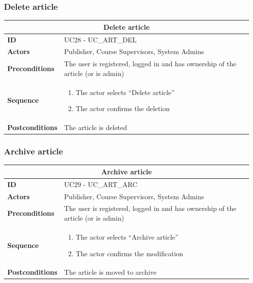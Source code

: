\subsubsection{Delete article}
\begin{tabular}{|m{2.5cm}|m{8cm}|}
	\hline
	\multicolumn{2}{|c|}{Delete article} \\
	\hline
	\textbf{ID} & UC28 - UC\_ART\_DEL \\
	\hline
	\textbf{Actors} & Publisher, Course Supervisors, System Admins \\
	\hline
	\textbf{Preconditions} & The user is registered, logged in and has ownership of the article (or is admin) \\
	\hline
	\textbf{Sequence} & 
	\begin{enumerate}
		\item The actor selects “Delete article”
		\item The actor confirms the deletion
	\end{enumerate} \\
	\hline
	\textbf{Postconditions} & The article is deleted \\
	\hline
\end{tabular}

\subsubsection{Archive article}
\begin{tabular}{|m{2.5cm}|m{8cm}|}
	\hline
	\multicolumn{2}{|c|}{Archive article} \\
	\hline
	\textbf{ID} & UC29 - UC\_ART\_ARC \\
	\hline
	\textbf{Actors} & Publisher, Course Supervisors, System Admins \\
	\hline
	\textbf{Preconditions} & The user is registered, logged in and has ownership of the article (or is admin) \\
	\hline
	\textbf{Sequence} & 
	\begin{enumerate}
		\item The actor selects “Archive article”
		\item The actor confirms the modification
	\end{enumerate} \\
	\hline
	\textbf{Postconditions} & The article is moved to archive \\
	\hline
\end{tabular}

